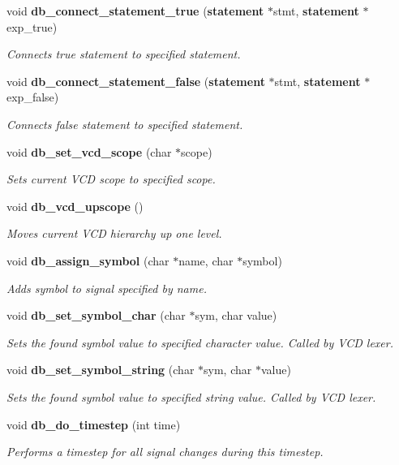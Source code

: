 \begin{CompactItemize}
void {\bf db\_\-connect\_\-statement\_\-true} ({\bf statement} $\ast$stmt, {\bf statement} $\ast$exp\_\-true)
\begin{CompactList}\small\item\em Connects true statement to specified statement.\item\end{CompactList}\item 
void {\bf db\_\-connect\_\-statement\_\-false} ({\bf statement} $\ast$stmt, {\bf statement} $\ast$exp\_\-false)
\begin{CompactList}\small\item\em Connects false statement to specified statement.\item\end{CompactList}\item 
void {\bf db\_\-set\_\-vcd\_\-scope} (char $\ast$scope)
\begin{CompactList}\small\item\em Sets current VCD scope to specified scope.\item\end{CompactList}\item 
void {\bf db\_\-vcd\_\-upscope} ()
\begin{CompactList}\small\item\em Moves current VCD hierarchy up one level.\item\end{CompactList}\item 
void {\bf db\_\-assign\_\-symbol} (char $\ast$name, char $\ast$symbol)
\begin{CompactList}\small\item\em Adds symbol to signal specified by name.\item\end{CompactList}\item 
void {\bf db\_\-set\_\-symbol\_\-char} (char $\ast$sym, char value)
\begin{CompactList}\small\item\em Sets the found symbol value to specified character value. Called by VCD lexer.\item\end{CompactList}\item 
void {\bf db\_\-set\_\-symbol\_\-string} (char $\ast$sym, char $\ast$value)
\begin{CompactList}\small\item\em Sets the found symbol value to specified string value. Called by VCD lexer.\item\end{CompactList}\item 
void {\bf db\_\-do\_\-timestep} (int time)
\begin{CompactList}\small\item\em Performs a timestep for all signal changes during this timestep.\item\end{CompactList}\end{CompactItemize}


